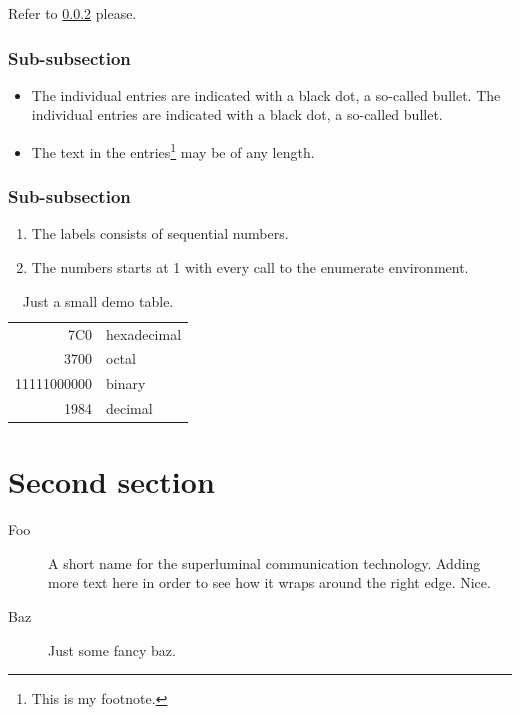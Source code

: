 \documentclass[a4paper,onecolumn,openany]{book}
\begin{document}
Refer to \ref{sec:subsubsection} please.

\lipsum[1]

\subsubsection{Sub-subsection}

\begin{itemize}
  \item The individual entries are indicated with a black dot, a so-called bullet.
The individual entries are indicated with a black dot, a so-called bullet.
  \item The text in the entries\footnote{This is my footnote.} may be of any length.
\end{itemize}

\lipsum[2]

\subsubsection{Sub-subsection}

\label{sec:subsubsection}
\begin{enumerate}
  \item The labels consists of sequential numbers.
  \item The numbers starts at 1 with every call to the enumerate environment.
\end{enumerate}

\begin{table}[hb]
    \centering
    \begin{tabular}{|r|l|}
        \hline
        7C0 & hexadecimal \\
        3700 & octal \\ \cline{2-2}
        11111000000 & binary \\
        \hline \hline
        1984 & decimal \\
        \hline
    \end{tabular}
    \caption{Just a small demo table.}
\end{table}

\section{Second section}
\begin{description}
\item[Foo] A short name for the superluminal communication technology.
Adding more text here in order to see how it wraps around the right edge. Nice.
\item[Baz] Just some fancy baz.
\end{description}
\end{document}
